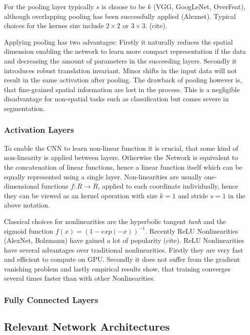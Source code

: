 For the pooling layer typically $s$ is choose to be $k$ (VGG, GoogLeNet, OverFeat),  although overlapping pooling has been successfully applied (Alexnet). Typical choices for the kernes size include $2 \times 2$ or $3 \times 3$. (cite).

Applying pooling has two  advantages: Firstly it naturally reduces the spatial dimension enabling the network to learn more compact representation if the data and decreasing the amount of parameters in the succeeding layers. Secondly it introduces robust translation invariant. Minor shifts in the input data will not result in the same activation after pooling. The drawback of pooling however is, that fine-grained spatial information are lost in the process. This is a negligible disadvantage for non-spatial tasks such as classification but comes severe in segmentation. 

 \subsubsection{Activation Layers}
 
 To enable the CNN to learn non-linear function it is crucial, that some kind of non-linearity is applied between layers. Otherwise the Network is equivalent to the concatenation of linear functions, hence a linear function itself which can be equally represented using a single layer. Non-linearities are usually one-dimensional functions $f: R \rightarrow R$, applied to each coordinate individually, hence they can be viewed as an kernel operation with size $k=1$ and stride $s=1$ in the above notation. 
 
Classical choices for nonlinearities are the hyperbolic tangent \emph{tanh} and the sigmoid function $f(x) = (1- exp(-x))^{-1}$. Recently ReLU Nonlinearities (AlexNet, Bolzmann) have gained a lot of popularity (cite). ReLU Nonlinearities have several advantages over traditional nonlinearities. Firstly they are very fast and efficient to compute on GPU. Secondly it does not suffer from the gradient vanishing problem and lastly empirical results show, that training converges several times faster than with other Nonlinearities.

\subsubsection{Fully Connected Layers}

\label{sec:fully_connected}

\subsection{Relevant Network Architectures}


